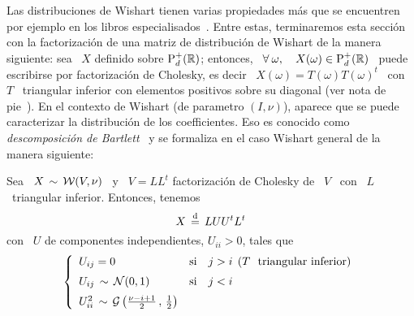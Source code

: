 Las distribuciones de Wishart tienen  varias propiedades m\'as que se encuentren
por ejemplo  en los  libros especialisados~\cite{Mui82, GupNag99,  And03, Seb04,
  NadKot04}. Entre estas, terminaremos  esta secci\'on con la factorizaci\'on de
una  matriz de  distribuci\'on de  Wishart  de la  manera siguiente:  sea \  $X$
definido sobre  $\mathrm{P}_d^+(\mathbb{R})$; entonces, \ $\forall \:  \omega, \quad X(\omega)
\in \mathrm{P}_d^+(\mathbb{R})$ \ puede escribirse por factorizaci\'on de Cholesky, es decir \
$X(\omega)  = T(\omega)  T(\omega)^t$  \ con  \  $T$ \  triangular inferior  con
elementos     positivos      sobre     su     diagonal      (ver     nota     de
pie~\footref{Foot:MP:WishartXtilde}).  En  el contexto de  Wishart (de parametro
$(I,\nu)$),  aparece  que  se   puede  caracterizar  la  distribuci\'on  de  los
coefficientes.     Eso    es   conocido    como    {\em   descomposici\'on    de
  Bartlett}~\cite{Bar34,  Mui82,  BilBre99,  GupNag99,  And03,  NadKot04}  y  se
formaliza en el caso Wishart general de la manera siguiente:
%
\begin{teorema}\label{Teo:MP:Bartlett}
%
  Sea \ $X \, \sim \, \mathcal{W}(V,\nu)$ \  y \ $V = L L^t$ factorizaci\'on de Cholesky
  de \ $V$ \ con \ $L$ \ triangular inferior. Entonces, tenemos
  \[
  X \, \stackrel{\mathrm{d}}{=} \, L U U^t L^t
  \]
  con \ $U$ de componentes independientes, $U_{ii} > 0$, tales que
  \[
  \left\{\begin{array}{lll}
  U_{ij} = 0 & \mbox{si} & j > i \:\: \mbox{($T$ \ triangular inferior)}\\[2mm]
  U_{ij} \, \sim \, \mathcal{N}(0,1) & \mbox{si} & j < i\\[2mm]
  U_{ii}^2 \, \sim \, \mathcal{G}\left( \frac{\nu-i+1}{2} \, , \, \frac12 \right) & &
  \end{array}\right.
  \]
\end{teorema}
%
